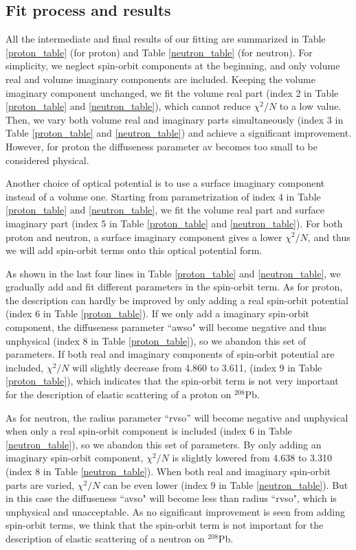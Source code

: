 \subsection{Fit process and results}
All the intermediate and final results of our fitting are summarized in Table \ref{proton_table} (for proton) and Table \ref{neutron_table} (for neutron). 
For simplicity, we neglect spin-orbit components at the beginning, and only volume real and volume imaginary components are included. 
Keeping the volume imaginary component unchanged, we fit the volume real part (index 2 in Table \ref{proton_table} and \ref{neutron_table}), 
which cannot reduce $\chi^2/N$ to a low value. 
Then, we vary both volume real and imaginary parts simultaneously (index 3 in Table \ref{proton_table} and \ref{neutron_table}) and 
achieve a significant improvement.  
However, for proton the diffuseness parameter av becomes too small to be considered physical. 
\par
Another choice of optical potential is to use a surface imaginary component instead of a volume one. 
Starting from parametrization of index 4 in Table \ref{proton_table} and \ref{neutron_table}, we fit the volume real part and surface imaginary part 
(index 5 in Table \ref{proton_table} and \ref{neutron_table}). 
For both proton and neutron, a surface imaginary component gives a lower $\chi^2/N$, 
and thus we will add spin-orbit terms onto this optical potential form. 
\par
As shown in the last four lines in Table \ref{proton_table} and \ref{neutron_table}, 
we gradually add and fit different parameters in the spin-orbit term.  
As for proton, the description can hardly be improved by only adding a real spin-orbit potential (index 6 in Table \ref{proton_table}).  
If we only add a imaginary spin-orbit component, the diffuseness parameter ``awso" will become negative and thus unphysical 
(index 8 in Table \ref{proton_table}), so we abandon this set of parameters. 
If both real and imaginary components of spin-orbit potential are included, $\chi^2/N$ will slightly decrease from 4.860 to 3.611,
(index 9 in Table \ref{proton_table}), which indicates that the spin-orbit term is not very important 
for the description of elastic scattering of a proton on $^{208}$Pb. 
\par
As for neutron, the radius parameter ``rvso'' will become negative and unphysical when only a real spin-orbit component is included 
(index 6 in Table \ref{neutron_table}), so we abandon this set of parameters. 
By only adding an imaginary spin-orbit component, $\chi^2/N$ is slightly lowered from 4.638 to 3.310 
(index 8 in Table \ref{neutron_table}). 
When both real and imaginary spin-orbit parts are varied, $\chi^2/N$ can be even lower (index 9 in Table \ref{neutron_table}). 
But in this case the diffuseness ``avso" will become less than radius ``rvso", which is unphysical and unacceptable. 
As no significant improvement is seen from adding spin-orbit terms, we think that 
the spin-orbit term is not important for the description of elastic scattering of a neutron on $^{208}$Pb. 

